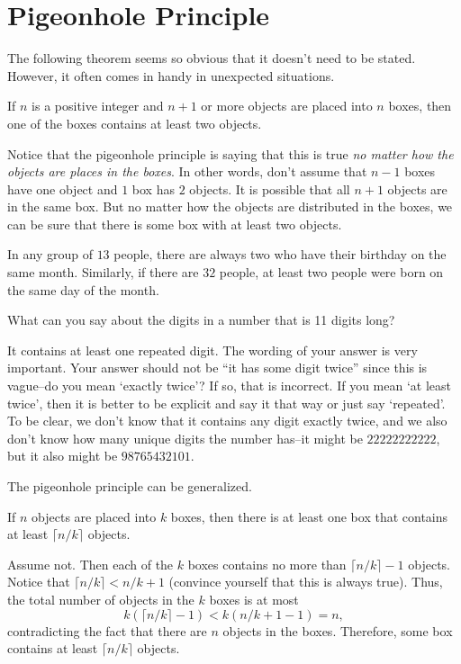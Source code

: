 \newpage

\section{Pigeonhole Principle}\label{sec:pigeon}
The following theorem seems so obvious that it doesn't need to be stated.
However, it often comes in handy in unexpected situations.
\begin{thm}
If $n$ is a positive integer and $n+1$ or more objects are placed
into $n$ boxes, then one of the boxes contains at least two objects.
\end{thm}

Notice that the pigeonhole principle is saying that this is true
{\em no matter how the objects are places in the boxes}.  In other words,
don't assume that $n-1$ boxes have one object and $1$ box has $2$ objects.
It is possible that all $n+1$ objects are in the same box.  
But no matter how the objects are distributed in the boxes, 
we can be sure that there is some box with at least two objects.

\begin{exa}
In any group of $13$ people, there are always two who have their birthday on the same month.
Similarly, if there are $32$ people, at least two people were born on the same day of the month.
\end{exa}

\begin{exer}
What can you say about the digits in a number that is 11 digits long?

\noindent
\answerline
\begin{answer}
It contains at least one repeated digit.  The wording of your answer is very
important.  Your answer should not be ``it has some digit twice'' since this
is vague--do you mean `exactly twice'?  If so, that is incorrect.  If you mean
`at least twice', then it is better to be explicit and say it that way or just say
`repeated'.  To be clear, we don't know that it contains any digit exactly twice,
and we also don't know how many unique digits the number has--it might be $22222222222$,
but it also might be $98765432101$.
\end{answer}
\end{exer}

The pigeonhole principle can be generalized.
\begin{thm}
If $n$ objects are placed into $k$ boxes, then there is at least one box that
contains at least $\lceil n/k\rceil$ objects.
\begin{pf}
Assume not.  Then each of the $k$ boxes contains no more than $\lceil n/k\rceil -1$ objects.
Notice that $\lceil n/k\rceil < n/k+1$ (convince yourself that this is always true).
Thus, the total number of objects in the $k$ boxes is at most
$$k\left(\lceil n/k\rceil -1\right)<k(n/k+1-1)=n,$$
contradicting the fact that there are $n$ objects in the boxes.
Therefore, some box contains at least $\lceil n/k\rceil$ objects.
\end{pf}
\end{thm}


